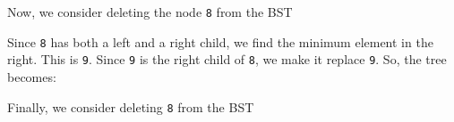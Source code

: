 \documentclass[a4paper, openany]{memoir}
\begin{document}
\begin{center}
\end{center}
Now, we consider deleting the node \texttt{8} from the BST
\begin{center}
\end{center}
Since \texttt{8} has both a left and a right child, we find the minimum element in the right. This is \texttt{9}. Since \texttt{9} is the right child of \texttt{8}, we make it replace \texttt{9}. So, the tree becomes:
\begin{center}
\end{center}
Finally, we consider deleting \texttt{8} from the BST
\begin{center}
\end{center}
\end{document}
